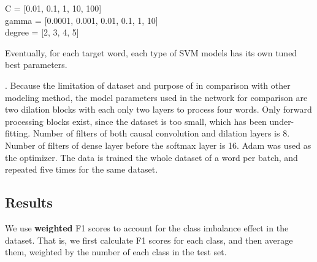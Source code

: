C = [0.01, 0.1, 1, 10, 100] \\
gamma = [0.0001, 0.001, 0.01, 0.1, 1, 10] \\
degree = [2, 3, 4, 5]

Eventually, for each target word, each type of SVM models has its own tuned best
parameters.

.
Because the limitation of dataset and purpose of in comparison with other modeling method, the model parameters used in the network for comparison are two dilation blocks with each only two layers to process four words. Only forward processing blocks exist, since the dataset is too small, which has been under-fitting. Number of filters of both causal convolution and dilation layers is 8. Number of filters of dense layer before the softmax layer is 16. Adam was used as the optimizer. The data is trained the whole dataset of a word per batch, and repeated five times for the same dataset. 

\subsection{Results}
\label{sec:eval:results}

We use \textbf{weighted} F1 scores to account for the class imbalance effect in
the dataset. 
That is, we first calculate F1 scores for each class, and then average them,
weighted by the number of each class in the test set.

